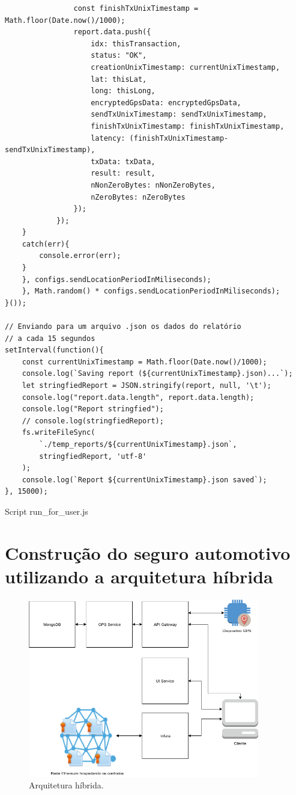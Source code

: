 \begin{code}
\begin{verbatim}
                const finishTxUnixTimestamp = Math.floor(Date.now()/1000);
                report.data.push({
                    idx: thisTransaction,
                    status: "OK",
                    creationUnixTimestamp: currentUnixTimestamp,
                    lat: thisLat,
                    long: thisLong,
                    encryptedGpsData: encryptedGpsData,
                    sendTxUnixTimestamp: sendTxUnixTimestamp,
                    finishTxUnixTimestamp: finishTxUnixTimestamp,
                    latency: (finishTxUnixTimestamp-sendTxUnixTimestamp),
                    txData: txData,
                    result: result,
                    nNonZeroBytes: nNonZeroBytes,
                    nZeroBytes: nZeroBytes
                });
            });
    }
    catch(err){
        console.error(err);
    }
    }, configs.sendLocationPeriodInMiliseconds);
    }, Math.random() * configs.sendLocationPeriodInMiliseconds);
}());

// Enviando para um arquivo .json os dados do relatório 
// a cada 15 segundos
setInterval(function(){
    const currentUnixTimestamp = Math.floor(Date.now()/1000);
    console.log(`Saving report (${currentUnixTimestamp}.json)...`);
    let stringfiedReport = JSON.stringify(report, null, '\t');
    console.log("report.data.length", report.data.length);
    console.log("Report stringfied");
    // console.log(stringfiedReport);
    fs.writeFileSync(
        `./temp_reports/${currentUnixTimestamp}.json`, 
        stringfiedReport, 'utf-8'
    );
    console.log(`Report ${currentUnixTimestamp}.json saved`);
}, 15000);
\end{verbatim}
\caption{Script run\_for\_user.js}
\label{lst:run_for_user_script}
\end{code}

\section{Construção do seguro automotivo utilizando a arquitetura híbrida}

\begin{figure}[h]
\centering
\includegraphics[width=0.9\textwidth]{Cap2/architecture_hybrid.png}
\caption{Arquitetura híbrida.}
\label{architecture_hybrid}
\end{figure}

